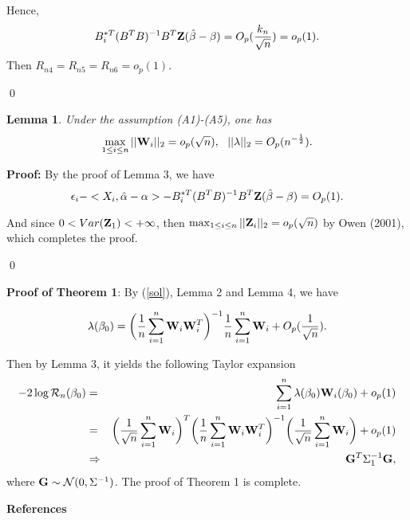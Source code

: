 \documentclass[preprint,12pt]{elsarticle}
\newtheorem{lemma}{Lemma}
\begin{document}
	Hence,
	\[B_i^{*T}(B^TB)^{-1}B^T{\bf Z}(\hat{\beta}-\beta)=O_p(\frac{k_n}{\sqrt{n}})=o_p(1).\]
	Then $R_{n4}=R_{n5}=R_{n6}=o_p(1)$.



	\qed




	\begin{lemma} Under the assumption (A1)-(A5), one has
		\[\max_{1\leq i\leq n}||{\bf W}_i||_2=o_p(\sqrt{n}),\ \ ||\lambda||_2=O_p(n^{-\frac{1}{2}}).\]
	\end{lemma}


	{\bf Proof:} By the proof of Lemma 3, we have
	\[\epsilon_i-<X_i,\hat{\alpha}-\alpha>-B_i^{*T}(B^TB)^{-1}B^T{\bf Z}(\hat{\beta}-\beta)=O_p(1).\]

	And since $0<Var({\bf Z}_1)<+\infty$, then $\max_{1\leq i\leq n}||{\bf Z}_i||_2=o_p(\sqrt{n})$ by Owen (2001), which completes the proof.
	
	\qed



	{\bf Proof of Theorem 1}: By (\ref{sol}), Lemma 2 and Lemma 4, we have 
	
	\[\lambda(\beta_0)=\bigg (\frac{1}{n}\sum_{i=1}^n{\bf W}_i{\bf W}_i^T\bigg )^{-1}\frac{1}{n}\sum_{i=1}^n{\bf W}_i+O_p(\frac{1}{\sqrt{n}}).\]

	Then by Lemma 3, it yields the following Taylor expansion 
	\begin{eqnarray*}
	-2\log\mathcal{R}_n(\beta_0)&=&\sum_{i=1}^n\lambda(\beta_0){\bf W}_i(\beta_0)+o_p(1)\\
		&=&\bigg (\frac{1}{\sqrt{n}}\sum_{i=1}^n{\bf W}_i\bigg )^T\bigg (\frac{1}{n}\sum_{i=1}^n{\bf W}_i{\bf W}_i^T\bigg )^{-1}\bigg (\frac{1}{\sqrt{n}}\sum_{i=1}^n{\bf W}_i\bigg )+o_p(1)\\
		&\Rightarrow& {\bf G}^T\Sigma_1^{-1}{\bf G},
	\end{eqnarray*}
	where ${\bf G}\sim \mathcal{N}(0,\Sigma^{-1})$. The proof of Theorem 1 is complete.














	
	\begin{center}
	\bf	References
	\end{center}
	
	
	
\end{document}
